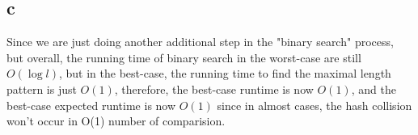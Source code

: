 \documentclass[12pt]{article}
\begin{document}
\begin{enumerate}
		\part{c} Since we are just doing another additional step in the "binary search" process, but overall, the running time of binary search in the worst-case are still $O(\log l)$, but in the best-case, the running time to find the maximal length pattern is just $O(1)$, therefore, the best-case runtime is now $O(1)$, and the best-case expected runtime is now $O(1)$ since in almost cases, the hash collision won't occur in O(1) number of comparision.
	\end{enumerate}
\end{document}
